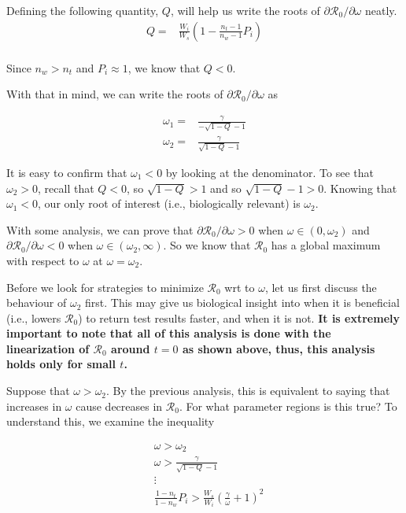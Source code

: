 \documentclass{article}
\newcommand{\Rnum}{\mathcal{R}_0}
\begin{document}
\hrulefill

Defining the following quantity, $Q$, will help us write the roots of $\partial{\Rnum}/\partial{\omega}$ neatly. 
\begin{align}\label{eq:defQ}
    Q =& \frac{W_i}{W_s}\left(1-\frac{n_{t}-1}{n_{w}-1}P_{i}\right) \\
\end{align}

Since $n_w > n_t$ and $P_i \approx 1$, we know that $Q < 0$.

With that in mind, we can write the roots of $\partial{\Rnum}/\partial{\omega}$ as

\begin{align}
    \omega_1 =& \frac{\gamma}{-\sqrt{1-Q}-1} \\
    \omega_2 =& \frac{\gamma}{\sqrt{1-Q}-1}
\end{align}

It is easy to confirm that $\omega_1 < 0$ by looking at the denominator. To see that $\omega_2 > 0$, recall that $Q < 0$, so $\sqrt{1-Q} > 1$ and so $\sqrt{1-Q} -1 > 0$. Knowing that $\omega_1 < 0$, our only root of interest (i.e., biologically relevant) is $\omega_2$. 

With some analysis, we can prove that $\partial{\Rnum}/\partial{\omega} > 0$ when $\omega \in (0,\omega_2)$ and $\partial{\Rnum}/\partial{\omega} < 0$ when $\omega \in (\omega_2,\infty)$. So we know that $\Rnum$ has a global maximum with respect to $\omega$ at $\omega = \omega_2$.

Before we look for strategies to minimize $\Rnum$ wrt to $\omega$, let us first discuss the behaviour of $\omega_2$ first. This may give us biological insight into when it is beneficial (i.e., lowers $\Rnum$) to return test results faster, and when it is not. \textbf{It is extremely important to note that all of this analysis is done with the linearization of $\Rnum$ around $t = 0$ as shown above, thus, this analysis holds only for small $t$.}

Suppose that $\omega > \omega_2$. By the previous analysis, this is equivalent to saying that increases in $\omega$ cause decreases in $\Rnum$. For what parameter regions is this true? To understand this, we examine the inequality

\begin{align}\label{eq:necsuf}
    &\omega > \omega_2 \nonumber \\
    &\omega > \frac{\gamma}{\sqrt{1-Q}-1} \nonumber \\
    &\vdots \nonumber \\
    &\frac{1-n_{t}}{1-n_{w}}P_{i}>\frac{W_{s}}{W_{i}}\left(\frac{\gamma}{\omega}+1\right)^{2}
\end{align}
\end{document}
